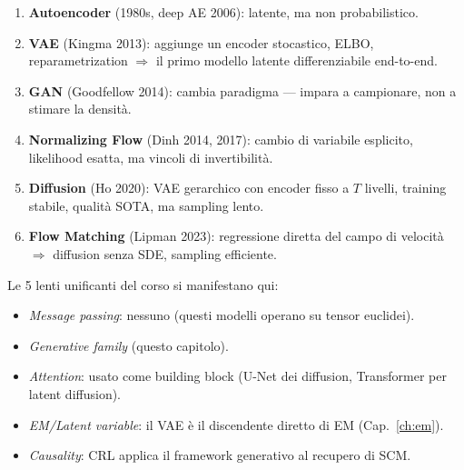 \begin{tcolorbox}[mybox, title={Famiglia generativa — la storia in 5 passi}]
\begin{enumerate}
  \item \textbf{Autoencoder} (1980s, deep AE 2006): latente, ma non probabilistico.
  \item \textbf{VAE} (Kingma 2013): aggiunge un encoder stocastico, ELBO, reparametrization $\Rightarrow$ il primo modello latente differenziabile end-to-end.
  \item \textbf{GAN} (Goodfellow 2014): cambia paradigma — impara a campionare, non a stimare la densità.
  \item \textbf{Normalizing Flow} (Dinh 2014, 2017): cambio di variabile esplicito, likelihood esatta, ma vincoli di invertibilità.
  \item \textbf{Diffusion} (Ho 2020): VAE gerarchico con encoder fisso a $T$ livelli, training stabile, qualità SOTA, ma sampling lento.
  \item \textbf{Flow Matching} (Lipman 2023): regressione diretta del campo di velocità $\Rightarrow$ diffusion senza SDE, sampling efficiente.
\end{enumerate}
Le 5 lenti unificanti del corso si manifestano qui:
\begin{itemize}
  \item \emph{Message passing}: nessuno (questi modelli operano su tensor euclidei).
  \item \emph{Generative family} (questo capitolo).
  \item \emph{Attention}: usato come building block (U-Net dei diffusion, Transformer per latent diffusion).
  \item \emph{EM/Latent variable}: il VAE è il discendente diretto di EM (Cap.~\ref{ch:em}).
  \item \emph{Causality}: CRL applica il framework generativo al recupero di SCM.
\end{itemize}
\end{tcolorbox}

